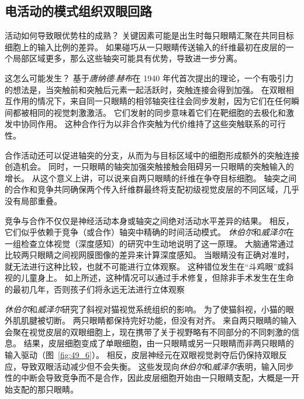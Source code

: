 \subsection{电活动的模式组织双眼回路}

活动如何导致眼优势柱的成熟？
关键因素可能是出生时每只眼睛汇聚在共同目标细胞上的输入比例的差异。
如果碰巧从一只眼睛传送输入的纤维最初在皮层的一个局部区域更多，那么这些轴突可能具有优势，导致进一步分离。


这怎么可能发生？
基于\textit{唐纳德$\cdot$赫布}在 1940 年代首次提出的理论，一个有吸引力的想法是，当突触前和突触后元素一起活跃时，突触连接会得到加强。
在双眼相互作用的情况下，来自同一只眼睛的相邻轴突往往会同步发射，因为它们在任何瞬间都被相同的视觉刺激激活。
它们发射的同步意味着它们在靶细胞的去极化和激发中协同作用。
这种合作行为以非合作突触为代价维持了这些突触联系的可行性。


合作活动还可以促进轴突的分支，从而为与目标区域中的细胞形成额外的突触连接创造机会。
同时，一只眼睛的轴突加强突触接触会阻碍另一只眼睛的突触输入的增长。
从这个意义上讲，可以说来自两只眼睛的纤维在争夺目标细胞。
轴突之间的合作和竞争共同确保两个传入纤维群最终将支配初级视觉皮层的不同区域，几乎没有局部重叠。


竞争与合作不仅仅是神经活动本身或轴突之间绝对活动水平差异的结果。
相反，它们似乎依赖于竞争（或合作）轴突中精确的时间活动模式。
\textit{休伯尔}和\textit{威泽尔}在一组检查立体视觉（深度感知）的研究中生动地说明了这一原理。
大脑通常通过比较两只眼睛之间视网膜图像的差异来计算深度感知。
当眼睛没有正确对准时，就无法进行这种比较，也就不可能进行立体观察。
这种错位发生在“斗鸡眼”或斜视的儿童身上。
如上所述，这种情况可以通过手术修复，但除非手术发生在生命的最初几年，否则孩子们将永远无法进行立体观察


\textit{休伯尔}和\textit{威泽尔}研究了斜视对猫视觉系统组织的影响。
为了使猫斜视，小猫的眼外肌肌腱被切断。 两只眼睛都保持完好功能，但没有对齐。
来自两只眼睛的输入会聚在视觉皮层的双眼细胞上，现在携带了关于视野略有不同部分的不同刺激的信息。
结果，皮层细胞变成了单眼细胞，由一只眼睛或另一只眼睛而非两只眼睛的输入驱动（图~\ref{fig:49_6}）。 
相反，皮层神经元在双眼视觉剥夺后仍保持双眼反应，导致双眼活动减少但不会失衡。
这些发现向\textit{休伯尔}和\textit{威泽尔}表明，输入同步性的中断会导致竞争而不是合作，因此皮层细胞开始由一只眼睛支配，大概是一开始支配的那只眼睛。


